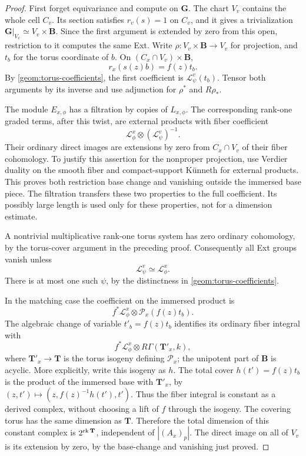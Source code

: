 \begin{proof}
First forget equivariance and compute on \(\mathbf G\). The chart
\(V_v\) contains the whole cell \(C_v\). Its section satisfies
\(r_v(s)=1\) on \(C_v\), and it gives a trivialization
\(\mathbf G|_{V_v}\simeq V_v\times\mathbf B\). Since the first
argument is extended by zero from this open, restriction to it
computes the same Ext. Write \(\rho:V_v\times\mathbf B\to V_v\)
for projection, and \(t_b\) for the torus coordinate of \(b\).
On \((C_x\cap V_v)\times\mathbf B\),
\[
 r_x(s(z)b)=f(z)t_b.
\]
By \eqref{geom:torus-coefficients}, the first coefficient is
\(\mathcal L^v_\psi(t_b)\). Tensor both arguments by its inverse and
use adjunction for \(\rho^*\) and \(R\rho_*\).

The module \(E_{x,\phi}\) has a filtration by copies of
\(L_{x,\phi}\). The corresponding rank-one graded terms, after this
twist, are external products with fiber coefficient
\[
 \mathcal L^x_\phi\otimes(\mathcal L^v_\psi)^{-1}.
\]
Their ordinary direct images are extensions by zero from
\(C_x\cap V_v\) of their fiber cohomology. To justify this assertion
for the nonproper projection, use Verdier duality on the smooth
fiber and compact-support K\"unneth for external products. This proves
both restriction base change and vanishing outside the immersed base
piece. The filtration transfers these two properties to the full
coefficient. Its possibly large length is used only for these
properties, not for a dimension estimate.

A nontrivial multiplicative rank-one torus system has zero ordinary
cohomology, by the torus-cover argument in the preceding proof.
Consequently all Ext groups vanish unless
\begin{equation}\label{geom:character-match}
 \mathcal L^v_\psi\simeq\mathcal L^x_\phi.
\end{equation}
There is at most one such \(\psi\), by the distinctness in
\eqref{geom:torus-coefficients}.

In the matching case the coefficient on the immersed product is
\[
 f^*\mathcal L^x_\phi\otimes\mathcal P_x(f(z)t_b).
\]
The algebraic change of variable \(t'_b=f(z)t_b\) identifies its
ordinary fiber integral with
\[
 f^*\mathcal L^x_\phi\otimes R\Gamma(\mathbf T'_x,k),
\]
where \(\mathbf T'_x\to\mathbf T\) is the torus isogeny defining
\(\mathcal P_x\); the unipotent part of \(\mathbf B\) is acyclic.
More explicitly, write this isogeny as \(h\).  The total cover
\(h(t')=f(z)t_b\) is the product of the immersed base with
\(\mathbf T'_x\), by
\((z,t')\mapsto(z,f(z)^{-1}h(t'),t')\).
Thus the fiber integral is constant as a derived complex, without
choosing a lift of \(f\) through the isogeny.
The covering torus has the same dimension as \(\mathbf T\). Therefore
the total dimension of this constant complex is
\(2^{\operatorname{rk}\mathbf T}\), independent of \(|(A_x)_p|\).
The direct image on all of \(V_v\) is its extension by zero, by the
base-change and vanishing just proved.


\end{proof}
